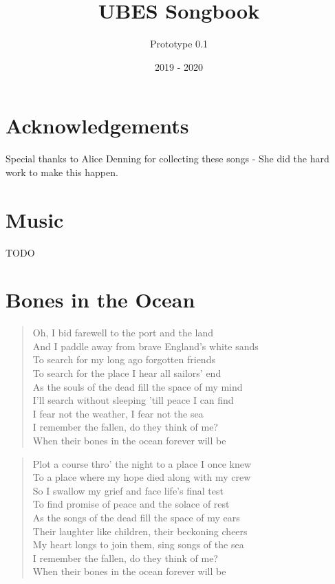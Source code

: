 \documentclass[8pt,twoside]{extarticle}
\title{UBES Songbook}
\author{Prototype 0.1}
\date{2019 - 2020}
\newenvironment{xverse}{
	\penalty 10000
	\begin{verse}
	\parskip 4pt
	}
	{
	\end{verse}
	\penalty 0
	}
\begin{document}

\maketitle
\newpage

\section*{Acknowledgements}
\center
Special thanks to Alice Denning for collecting these songs - She did the hard
work to make this happen.
\newpage

\tableofcontents

\section{Music}
TODO


\section{Bones in the Ocean}

\begin{xverse}
Oh, I bid farewell to the port and the land \\
And I paddle away from brave England's white sands \\
To search for my long ago forgotten friends \\
To search for the place I hear all sailors’ end \\
As the souls of the dead fill the space of my mind \\
I'll search without sleeping 'till peace I can find \\
I fear not the weather, I fear not the sea \\
I remember the fallen, do they think of me? \\
When their bones in the ocean forever will be \\
\end{xverse}

\begin{xverse}
Plot a course thro' the night to a place I once knew \\
To a place where my hope died along with my crew \\
So I swallow my grief and face life's final test \\
To find promise of peace and the solace of rest \\
As the songs of the dead fill the space of my ears \\
Their laughter like children, their beckoning cheers \\
My heart longs to join them, sing songs of the sea \\
I remember the fallen, do they think of me? \\
When their bones in the ocean forever will be \\
\end{xverse}
\end{document}
